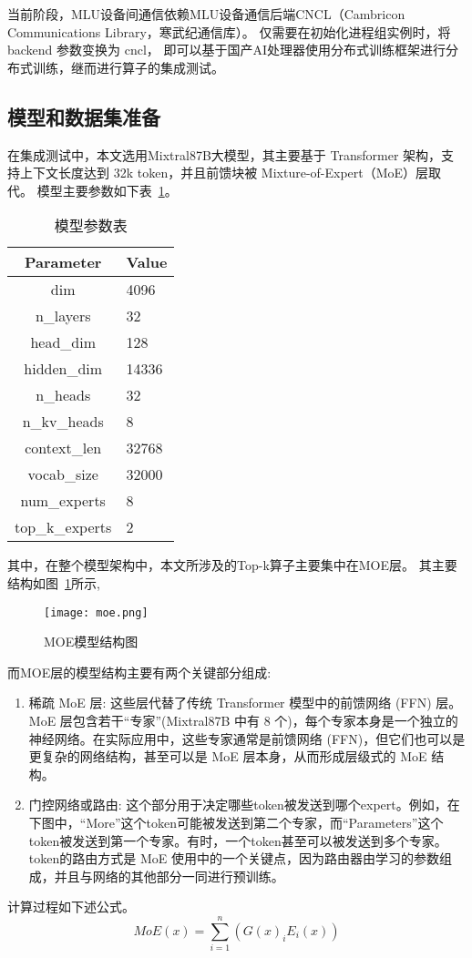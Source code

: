 当前阶段，MLU设备间通信依赖MLU设备通信后端CNCL（Cambricon Communications Library，寒武纪通信库）。
仅需要在初始化进程组实例时，将backend 参数变换为 cncl，
即可以基于国产AI处理器使用分布式训练框架进行分布式训练，继而进行算子的集成测试。





\subsection{模型和数据集准备}
在集成测试中，本文选用Mixtral8\times7B大模型，其主要基于 Transformer 架构，支持上下文长度达到 32k token，并且前馈块被 Mixture-of-Expert（MoE）层取代。
模型主要参数如下表~\ref{tab:model}。
\begin{table}
    \centering
    \caption{模型参数表}
    \label{tab:model}
    \begin{tabular}{cl}
        \toprule
        Parameter       &Value   \\
        \midrule
        dim & 4096 \\
        n\_layers & 32 \\
        head\_dim & 128 \\
        hidden\_dim & 14336 \\
        n\_heads & 32 \\
        n\_kv\_heads & 8 \\
        context\_len & 32768 \\
        vocab\_size & 32000 \\
        num\_experts & 8 \\
        top\_k\_experts & 2 \\
        \bottomrule
    \end{tabular}
    \end{table}

    其中，在整个模型架构中，本文所涉及的Top-k算子主要集中在MOE层。
    其主要结构如图~\ref{fig:moe}所示,
\begin{figure}[ht]
    \centering
    \texttt{[image: moe.png]}
    \caption{MOE模型结构图}
    \label{fig:moe}
\end{figure}

而MOE层的模型结构主要有两个关键部分组成:
\begin{enumerate}
    \item{稀疏 MoE 层}: 这些层代替了传统 Transformer 模型中的前馈网络 (FFN) 层。MoE 层包含若干“专家”(Mixtral8\times7B 中有 8 个)，每个专家本身是一个独立的神经网络。在实际应用中，这些专家通常是前馈网络 (FFN)，但它们也可以是更复杂的网络结构，甚至可以是 MoE 层本身，从而形成层级式的 MoE 结构。
    \item {门控网络或路由}:
    这个部分用于决定哪些token被发送到哪个expert。例如，在下图中，“More”这个token可能被发送到第二个专家，而“Parameters”这个token被发送到第一个专家。有时，一个token甚至可以被发送到多个专家。token的路由方式是 MoE 使用中的一个关键点，因为路由器由学习的参数组成，并且与网络的其他部分一同进行预训练。
\end{enumerate}
计算过程如下述公式。
\begin{equation}
MoE(x) = \sum_{i = 1}^{n} (G(x)_i E_i(x))
\end{equation}


